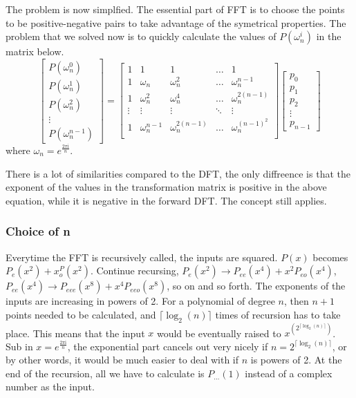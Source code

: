\documentclass[12pt]{article}
\begin{document}
The problem is now simplfied. The essential part of FFT is to choose the points to be positive-negative pairs to 
take advantage of the symetrical properties. The problem that we solved now is to quickly calculate the values of 
$P(\omega_n^i)$ in the matrix below. 
$$
\begin{bmatrix}
    P(\omega_n^0) \\  P(\omega_n^1) \\ P(\omega_n^2)  \\  \vdots \\   P(\omega_n^{n-1})
\end{bmatrix}
=
\begin{bmatrix}
    1   &   1               &   1                   &   \dots   &   1                       \\
    1   &   \omega_n        &   \omega_n^2          &   \dots   &   \omega_n^{n-1}          \\
    1   &   \omega_n^2      &   \omega_n^4          &   \dots   &   \omega_n^{2(n-1)}       \\
    \vdots & \vdots         &   \vdots              &   \ddots  &   \vdots                  \\
    1   &   \omega_n^{n-1}  &   \omega_n^{2(n-1)}   &   \dots   &   \omega_n^{(n-1)^2}      \\
\end{bmatrix}
\begin{bmatrix}
    p_0 \\  p_1 \\ p_2  \\  \vdots \\   p_{n-1}
\end{bmatrix}
$$
where $\omega_n = e^{\frac{2\pi\mathrm{i}}{n}}$.

There is a lot of similarities compared to the DFT, the only diffreence is that 
the exponent of the values in the transformation matrix is positive in the above equation, while it is negative in 
the forward DFT. The concept still applies.


\subsubsection{Choice of n}
Everytime the FFT is recursively called, the inputs are squared. $P(x)$ becomes $P_e(x^2)+x^P_o(x^2)$. 
Continue recursing, $P_e(x^2)\rightarrow P_{ee}(x^4)+x^2P_{eo}(x^4)$, 
$P_{ee}(x^4)\rightarrow P_{eee}(x^8)+x^4P_{eeo}(x^8)$, 
so on and so forth. The exponents of the inputs are increasing in powers of 2. For a polynomial of degree $n$, 
then $n+1$ points needed to be calculated, and $\lceil\log_{2}(n)\rceil$ times of recursion has to take place. 
This means that the input $x$ would be eventually raised to $x^{(2^{\lceil\log_{2}(n)\rceil})}$. 
Sub in $x=e^{\frac{2\pi\mathrm{i}}{n}}$, 
the exponential part cancels out very nicely if $n=2^{\lceil\log_{2}(n)\rceil}$, or by other words, 
it would be much easier to deal with if $n$ is powers of 2. 
At the end of the recursion, all we have to calculate is $P_{\dots}(1)$ instead of a complex number as the input.
\end{document}
